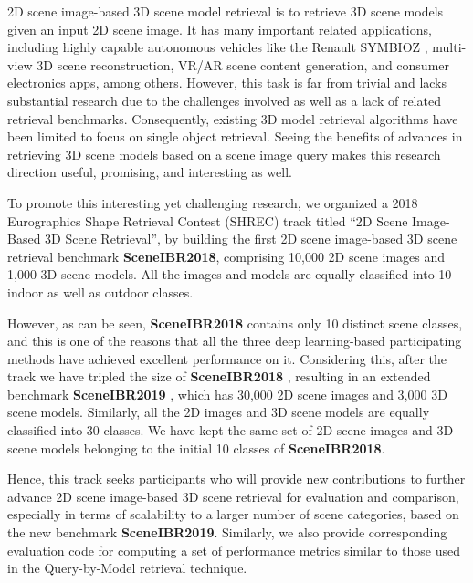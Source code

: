 \documentclass[../main.tex]{subfiles}
\begin{document}
2D scene image-based 3D scene model retrieval is to retrieve 3D scene models 
given an input 2D scene image. It has many important related applications, 
including highly capable autonomous vehicles like the Renault SYMBIOZ 
\cite{Renault} \cite{Youtube}, multi-view 3D scene reconstruction, VR/AR scene 
content generation, and consumer electronics apps, among others. However, this 
task is far from trivial and lacks substantial research due to the challenges 
involved as well as a lack of related retrieval benchmarks. Consequently, 
existing 3D model retrieval algorithms have been limited to focus on single 
object retrieval. Seeing the benefits of advances in retrieving 3D scene models 
based on a scene image query makes this research direction useful, promising, 
and interesting as well.

To promote this interesting yet challenging research, we organized a 2018 Eurographics Shape Retrieval Contest (SHREC) track \cite{SHREC18-SceneIBR-Track} titled “2D Scene Image-Based 3D Scene Retrieval”, by building the first 2D scene image-based 3D scene retrieval benchmark \textbf{SceneIBR2018}, comprising 10,000 2D scene images and 1,000 3D scene models. All the images and models are equally classified into 10 indoor as well as outdoor classes.

However, as can be seen, \textbf{SceneIBR2018} contains only 10 distinct scene classes, and this is one of the reasons that all the three deep learning-based participating methods have achieved excellent performance on it. Considering this, after the track we have tripled the size of \textbf{SceneIBR2018} , resulting in an extended benchmark \textbf{SceneIBR2019} \cite{MIPR}, which has 30,000 2D scene images and 3,000 3D scene models. Similarly, all the 2D images and 3D scene models are equally classified into 30 classes. We have kept the same set of 2D scene images and 3D scene models belonging to the initial 10 classes of \textbf{SceneIBR2018}.

Hence, this track seeks participants who will provide new contributions to further advance 2D scene image-based 3D scene retrieval for evaluation and comparison, especially in terms of scalability to a larger number of scene categories, based on the new benchmark \textbf{SceneIBR2019}. Similarly, we also provide corresponding evaluation code for computing a set of performance metrics similar to those used in the Query-by-Model retrieval technique.
\end{document}
